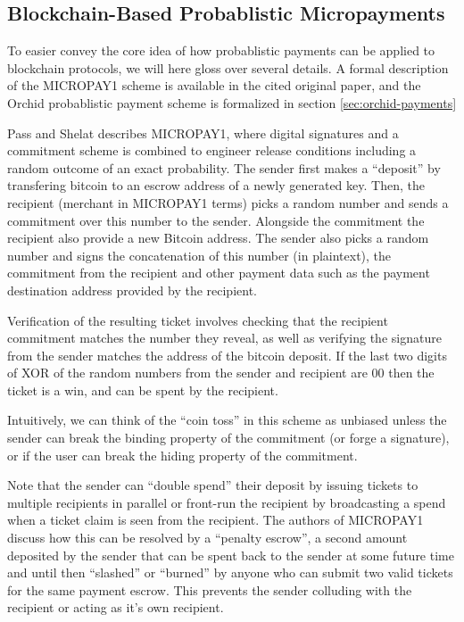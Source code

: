 \subsection{Blockchain-Based Probablistic Micropayments}

To easier convey the core idea of how probablistic payments can be applied to blockchain protocols, we will here gloss over several details. A formal description of the MICROPAY1 scheme is available in the cited original paper, and the Orchid probablistic payment scheme is formalized in section \ref{sec:orchid-payments}

Pass and Shelat describes MICROPAY1\cite{Micropayments}, where digital signatures and a commitment scheme is combined to engineer release conditions including a random outcome of an exact probability. The sender first makes a ``deposit'' by transfering bitcoin to an escrow address of a newly generated key. Then, the recipient (merchant in MICROPAY1 terms) picks a random number and sends a commitment over this number to the sender. Alongside the commitment the recipient also provide a new Bitcoin address. The sender also picks a random number and signs the concatenation of this number (in plaintext), the commitment from the recipient and other payment data such as the payment destination address provided by the recipient.

Verification of the resulting ticket involves checking that the recipient commitment matches the number they reveal, as well as verifying the signature from the sender matches the address of the bitcoin deposit. If the last two digits of XOR of the random numbers from the sender and recipient are 00 then the ticket is a win, and can be spent by the recipient.

Intuitively, we can think of the ``coin toss'' in this scheme as unbiased unless the sender can break the binding property of the commitment (or forge a signature), or if the user can break the hiding property of the commitment.

Note that the sender can ``double spend'' their deposit by issuing tickets to multiple recipients in parallel or front-run the recipient by broadcasting a spend when a ticket claim is seen from the recipient. The authors of MICROPAY1 discuss how this can be resolved by a ``penalty escrow'', a second amount deposited by the sender that can be spent back to the sender at some future time and until then  ``slashed'' or ``burned'' by anyone who can submit two valid tickets for the same payment escrow. This prevents the sender colluding with the recipient or acting as it's own recipient.

